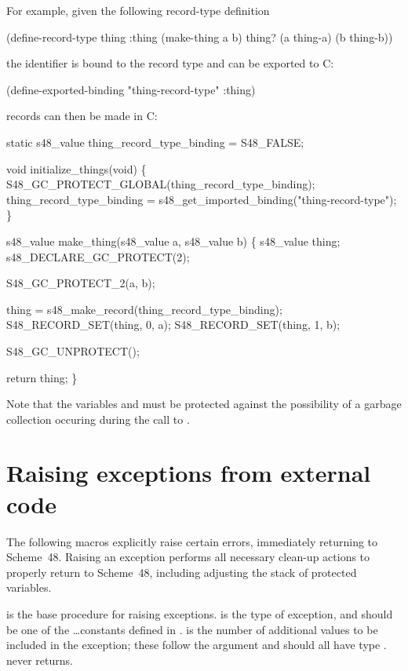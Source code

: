 For example, given the following record-type definition
\begin{example}
(define-record-type thing :thing
  (make-thing a b)
  thing?
  (a thing-a)
  (b thing-b))
\end{example}
 the identifier  is bound to the record type and can
 be exported to C:
\begin{example}
(define-exported-binding "thing-record-type" :thing)
\end{example}
 records can then be made in C:
\begin{example}
static s48_value
  thing_record_type_binding = S48_FALSE;

void initialize_things(void)
\{
  S48_GC_PROTECT_GLOBAL(thing_record_type_binding);
  thing_record_type_binding =
     s48_get_imported_binding("thing-record-type");
\}

s48_value make_thing(s48_value a, s48_value b)
\{
  s48_value thing;
  s48_DECLARE_GC_PROTECT(2);

  S48_GC_PROTECT_2(a, b);

  thing = s48_make_record(thing_record_type_binding);
  S48_RECORD_SET(thing, 0, a);
  S48_RECORD_SET(thing, 1, b);

  S48_GC_UNPROTECT();

  return thing;
\}
\end{example}
Note that the variables  and  must be protected
 against the possibility of a garbage collection occuring during
 the call to .

\section{Raising exceptions from external code}
\label{sec:exceptions}

The following macros explicitly raise certain errors, immediately
 returning to Scheme~48.
Raising an exception performs all
 necessary clean-up actions to properly return to Scheme~48, including
 adjusting the stack of protected variables.

\begin{protos}
\end{protos}

\noindent{} is the base procedure for
 raising exceptions.
 is the type of exception, and should be one of the
 \ldots constants defined in .
 is the number of additional values to be included in the
 exception; these follow the  argument and should all have
 type .
 never returns.
 
